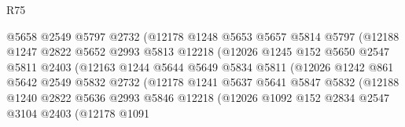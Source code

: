\begin{lexlean}{R75}
\begin{coremodule}
                              @5658
                              @2549
                              @5797
                              @2732
                              (@12178
                                @1248
                                @5653
                                @5657
                                @5814
                                @5797
                                (@12188
                                  @1247
                                  @2822
                                  @5652
                                  @2993
                                  @5813
                                  @12218
                                  (@12026
                                    @1245
                                    @152
                                    @5650
                                    @2547
                                    @5811
                                    @2403
                                    (@12163
                                      @1244
                                      @5644
                                      @5649
                                      @5834
                                      @5811
                                      (@12026
                                        @1242
                                        @861
                                        @5642
                                        @2549
                                        @5832
                                        @2732
                                        (@12178
                                          @1241
                                          @5637
                                          @5641
                                          @5847
                                          @5832
                                          (@12188
                                            @1240
                                            @2822
                                            @5636
                                            @2993
                                            @5846
                                            @12218
                                            (@12026
                                              @1092
                                              @152
                                              @2834
                                              @2547
                                              @3104
                                              @2403
                                              (@12178
                                                @1091

\end{coremodule}
\end{lexlean}
